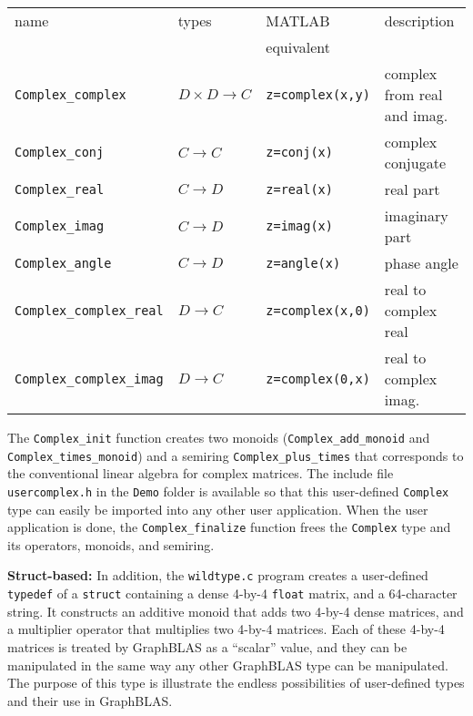 \documentclass[12pt]{article}
\begin{document}
\vspace{0.1in}
{\footnotesize
\begin{tabular}{llll}
\hline
name                    & types             & MATLAB        & description \\
                        &                   & equivalent    & \\
\hline
\verb'Complex_complex'  & $D \times D \rightarrow C$ & \verb'z=complex(x,y)' & complex from real and imag. \\
\hline
\verb'Complex_conj'     & $C \rightarrow C$ & \verb'z=conj(x)'  & complex conjugate \\
\verb'Complex_real'     & $C \rightarrow D$ & \verb'z=real(x)'  & real part \\
\verb'Complex_imag'     & $C \rightarrow D$ & \verb'z=imag(x)'  & imaginary part \\
\verb'Complex_angle'    & $C \rightarrow D$ & \verb'z=angle(x)' & phase angle \\
\verb'Complex_complex_real'  & $D \rightarrow C$ & \verb'z=complex(x,0)' & real to complex real \\
\verb'Complex_complex_imag'  & $D \rightarrow C$ & \verb'z=complex(0,x)' & real to complex imag. \\
\hline
\end{tabular}
}

The \verb'Complex_init' function creates two monoids (\verb'Complex_add_monoid'
and \verb'Complex_times_monoid') and a semiring \verb'Complex_plus_times' that
corresponds to the conventional linear algebra for complex matrices.  The
include file \verb'usercomplex.h' in the \verb'Demo' folder is available so
that this user-defined \verb'Complex' type can easily be imported into any
other user application.  When the user application is done, the
\verb'Complex_finalize' function frees the \verb'Complex' type and its
operators, monoids, and semiring.

{\bf Struct-based:}
In addition, the \verb'wildtype.c' program  creates a user-defined
\verb'typedef' of a \verb'struct' containing a dense 4-by-4 \verb'float'
matrix, and a 64-character string.  It constructs an additive monoid that adds
two 4-by-4 dense matrices, and a multiplier operator that multiplies two 4-by-4
matrices.  Each of these 4-by-4 matrices is treated by GraphBLAS as a
``scalar'' value, and they can be manipulated in the same way any other
GraphBLAS type can be manipulated. The purpose of this type is illustrate the
endless possibilities of user-defined types and their use in GraphBLAS.
\end{document}
